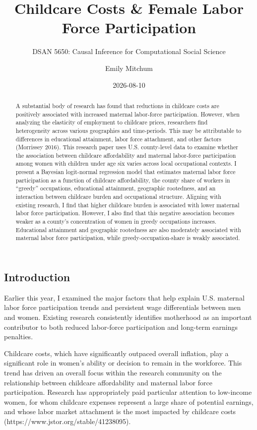 \documentclass[
  letterpaper,
  DIV=11,
  numbers=noendperiod]{scrartcl}
\title{Childcare Costs \& Female Labor Force Participation}
\subtitle{DSAN 5650: Causal Inference for Computational Social Science}
\author{Emily Mitchum}
\date{2026-08-10}
\begin{document}
\maketitle
\begin{abstract}
A substantial body of research has found that reductions in childcare
costs are positively associated with increased maternal labor-force
participation. However, when analyzing the elasticity of employment to
childcare prices, researchers find heterogeneity across various
geographies and time-periods. This may be attributable to differences in
educational attainment, labor force attachment, and other factors
(Morrissey 2016). This research paper uses U.S. county-level data to
examine whether the association between childcare affordability and
maternal labor-force participation among women with children under age
six varies across local occupational contexts. I present a Bayesian
logit-normal regression model that estimates maternal labor force
participation as a function of childcare affordability, the county share
of workers in ``greedy'' occupations, educational attainment, geographic
rootedness, and an interaction between childcare burden and occupational
structure. Aligning with existing research, I find that higher childcare
burden is associated with lower maternal labor force participation.
However, I also find that this negative association becomes weaker as a
county's concentration of women in greedy occupations increases.
Educational attainment and geographic rootedness are also moderately
associated with maternal labor force participation, while
greedy-occupation-share is weakly associated.
\end{abstract}


\subsection{Introduction}\label{sec-1}

Earlier this year, I examined the major factors that help explain U.S.
maternal labor force participation trends and persistent wage
differentials between men and women. Existing research consistently
identifies motherhood as an important contributor to both reduced
labor-force participation and long-term earnings penalties.

Childcare costs, which have significantly outpaced overall inflation,
play a significant role in women's ability or decision to remain in the
workforce. This trend has driven an overall focus within the research
community on the relationship between childcare affordability and
maternal labor force participation. Research has appropriately paid
particular attention to low-income women, for whom childcare expenses
represent a large share of potential earnings, and whose labor market
attachment is the most impacted by childcare costs
(https://www.jstor.org/stable/41238095).
\end{document}
